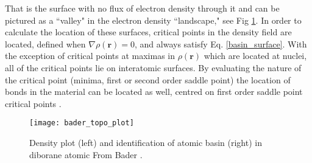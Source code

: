 That is the surface with no flux of electron density through it and can be pictured as a ``valley" in the electron density ``landscape," see Fig \ref{topo_plot}. In order to  calculate the location of these surfaces, critical points in the density field are located, defined when $\nabla \rho(\textbf{r})=0$, and always satisfy Eq. \ref{basin_surface}.  With the exception of critical points at maximas in $\rho(\textbf{r})$ which are located at nuclei, all of the critical points lie on interatomic surfaces\cite{critic2}.  By evaluating the nature of the critical point (minima, first or second order saddle point) the location of bonds in the material can be located as well, centred on first order saddle point critical points \cite{critic2}.

\begin{figure}
	\centering
	\texttt{[image: bader\_topo\_plot]}
	\caption{Density plot (left) and identification of atomic basin (right) in diborane atomic From Bader \cite{bader}.}
	\label{topo_plot}
\end{figure}

